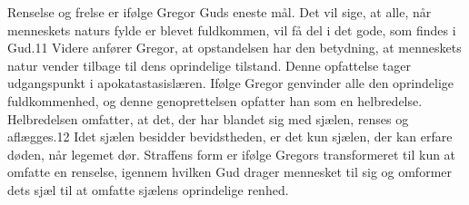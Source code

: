 Renselse og frelse er ifølge Gregor Guds eneste mål. Det vil sige, at alle, når menneskets naturs fylde er blevet fuldkommen, vil få del i det gode, som findes i Gud.11 Videre anfører Gregor, at opstandelsen har den betydning, at menneskets natur vender tilbage til dens oprindelige tilstand. Denne opfattelse tager udgangspunkt i apokatastasislæren. Ifølge Gregor genvinder alle den oprindelige fuldkommenhed, og denne genoprettelsen opfatter han som en helbredelse. Helbredelsen omfatter, at det, der har blandet sig med sjælen, renses og aflægges.12 Idet sjælen besidder bevidstheden, er det kun sjælen, der kan erfare døden, når legemet dør. Straffens form er ifølge Gregors transformeret til kun at omfatte en renselse, igennem hvilken Gud drager mennesket til sig og omformer dets sjæl til at omfatte sjælens oprindelige renhed.